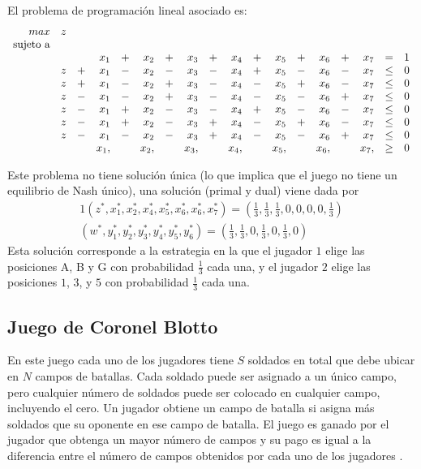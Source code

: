 El problema de programación lineal asociado es:
\begin{equation}
\begin{array}{r r r r r r r r r r r r r r r r r r}
max        &z& &   & &   & &   & &   & &   & &   & &   &      & \\
\text{sujeto a} \\  
	& & &x_1&+&x_2&+&x_3&+&x_4&+&x_5&+&x_6&+&x_7& =    &1 \\
    &z&+&x_1&-&x_2&-&x_3&-&x_4&+&x_5&-&x_6&-&x_7& \leq &0 \\
    &z&+&x_1&-&x_2&+&x_3&-&x_4&-&x_5&+&x_6&-&x_7& \leq &0 \\
    &z&-&x_1&-&x_2&+&x_3&-&x_4&-&x_5&-&x_6&+&x_7& \leq &0 \\
    &z&-&x_1&+&x_2&-&x_3&-&x_4&+&x_5&-&x_6&-&x_7& \leq &0 \\
    &z&-&x_1&+&x_2&-&x_3&+&x_4&-&x_5&+&x_6&-&x_7& \leq &0 \\
    &z&-&x_1&-&x_2&-&x_3&+&x_4&-&x_5&-&x_6&+&x_7& \leq &0 \\
    & & &x_1,&&x_2,&&x_3,&&x_4,&&x_5,&&x_6,&&x_7,&\geq &0 \\
\end{array}
\end{equation}

Este problema no tiene solución única (lo que implica que el juego no tiene un equilibrio de Nash único), una solución (primal y dual) viene dada por
\begin{alignat}{1}
(z^*, x^*_1, x^*_2, x^*_4, x^*_5, x^*_6, x^*_6, x^*_7) = \left(\frac{1}{3}, \frac{1}{3}, \frac{1}{3}, 0, 0, 0, 0, \frac{1}{3}\right) \\
(w^*, y^*_1, y^*_2, y^*_3,  y^*_4, y^*_5, y^*_6) = \left(\frac{1}{3}, \frac{1}{3}, 0, \frac{1}{3}, 0, \frac{1}{3}, 0\right)
\end{alignat}
Esta solución corresponde a la estrategia en la que el jugador $1$ elige las posiciones A, B y G con probabilidad $\frac{1}{3}$ cada una, y el jugador $2$ elige las posiciones $1$, $3$, y $5$ con probabilidad $\frac{1}{3}$ cada una.

\subsection*{Juego de Coronel Blotto}

En este juego cada uno de los jugadores tiene $S$ soldados en total que debe ubicar en $N$ campos de batallas. Cada soldado puede ser asignado a un único campo, pero cualquier número de soldados puede ser colocado en cualquier campo, incluyendo el cero. Un jugador obtiene un campo de batalla si asigna más soldados que su oponente en ese campo de batalla. El juego es ganado por el jugador que obtenga un mayor número de campos y su pago es igual a la diferencia entre el número de campos obtenidos por cada uno de los jugadores \cite{bib:blotto-game}.

